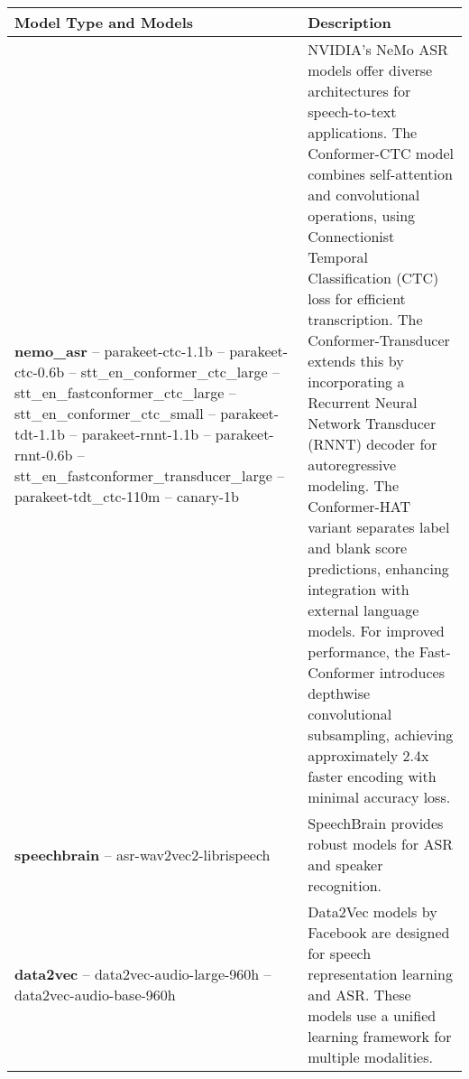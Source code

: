 \begin{table*}[h!]
\renewcommand{\arraystretch}{0.90} %
\centering
\small
\begin{tabular}{p{}p{}}
\toprule
\textbf{Model Type and Models} & \textbf{Description} \\ \midrule

\textbf{nemo\_asr} \newline 
-- parakeet-ctc-1.1b \newline 
-- parakeet-ctc-0.6b \newline 
-- stt\_en\_conformer\_ctc\_large \newline 
-- stt\_en\_fastconformer\_ctc\_large \newline 
-- stt\_en\_conformer\_ctc\_small \newline 
-- parakeet-tdt-1.1b \newline 
-- parakeet-rnnt-1.1b \newline 
-- parakeet-rnnt-0.6b \newline 
-- stt\_en\_fastconformer\_transducer\_large \newline 
-- parakeet-tdt\_ctc-110m \newline 
-- canary-1b & 
NVIDIA's NeMo ASR models offer diverse architectures for speech-to-text applications. The Conformer-CTC model combines self-attention and convolutional operations, using Connectionist Temporal Classification (CTC) loss for efficient transcription. The Conformer-Transducer extends this by incorporating a Recurrent Neural Network Transducer (RNNT) decoder for autoregressive modeling. The Conformer-HAT variant separates label and blank score predictions, enhancing integration with external language models. For improved performance, the Fast-Conformer introduces depthwise convolutional subsampling, achieving approximately 2.4x faster encoding with minimal accuracy loss. \\ \hline

\textbf{speechbrain} \newline 
-- asr-wav2vec2-librispeech & 
SpeechBrain provides robust models for ASR and speaker recognition. \\ \hline

\textbf{data2vec} \newline 
-- data2vec-audio-large-960h \newline 
-- data2vec-audio-base-960h & 
Data2Vec models by Facebook are designed for speech representation learning and ASR. These models use a unified learning framework for multiple modalities. \\ \hline


\end{tabular}
\end{table*}
